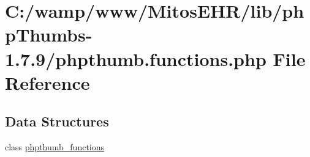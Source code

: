 \hypertarget{phpthumb_8functions_8php}{\section{\-C\-:/wamp/www/\-Mitos\-E\-H\-R/lib/php\-Thumbs-\/1.7.9/phpthumb.functions.\-php \-File \-Reference}
\label{phpthumb_8functions_8php}
}
\subsection*{\-Data \-Structures}
\begin{DoxyCompactItemize}
\item 
class \hyperlink{classphpthumb__functions}{phpthumb\-\_\-functions}
\end{DoxyCompactItemize}
